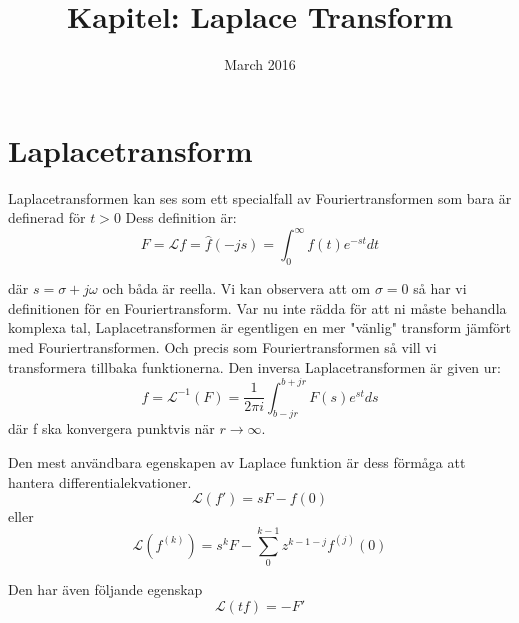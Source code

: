 \documentclass{article}
\title{Kapitel: Laplace Transform}
\author{ }
\date{March 2016}
\begin{document}
\maketitle

\section{Laplacetransform}



Laplacetransformen kan ses som ett specialfall av Fouriertransformen som bara är definerad för $t>0$
Dess definition är:
$$F = \mathcal{L} f = \hat{f}(-js) = \int_{0}^{\infty} f(t)e^{-st} dt $$

där $s = \sigma + j \omega$ och båda är reella. Vi kan observera att om $\sigma = 0$ så har vi definitionen
för en Fouriertransform. Var nu inte rädda för att ni måste behandla komplexa tal, Laplacetransformen är
egentligen en mer "vänlig" transform jämfört med Fouriertransformen. 
Och precis som Fouriertransformen så vill vi transformera tillbaka funktionerna. 
Den inversa Laplacetransformen är given ur:
$$f = \mathcal{L}^{-1} (F) = \frac{1}{2 \pi i} \int_{b-jr}^{b+jr} F(s) e^{st} ds $$ 
där f ska konvergera punktvis när $r\rightarrow \infty$.

Den mest användbara egenskapen av Laplace funktion är dess förmåga att hantera differentialekvationer.
$$\mathcal{L} (f') = s F - f(0)$$
eller
$$\mathcal{L} (f^{(k)}) = s^k F - \sum_{0}^{k-1} z^{k-1-j} f^{(j)} (0)$$

Den har även följande egenskap 
$$\mathcal{L} (t f) = -F' $$
\end{document}
